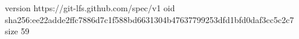 version https://git-lfs.github.com/spec/v1
oid sha256:ee22adde2ffc7886d7c1f588bd6631304b47637799253dfd1bfd0daf3cc5c2c7
size 59
